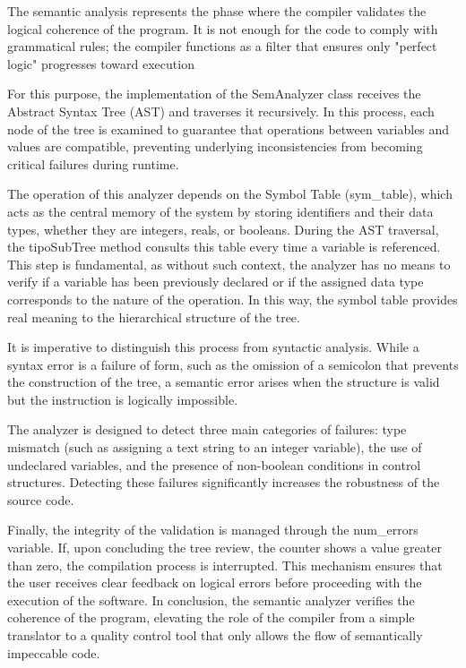 \documentclass[letterpaper,12pt,oneside]{article}
\begin{document}
{The semantic analysis represents the phase where the compiler validates the logical coherence of the program. It is not enough for the code to comply with grammatical rules; the compiler functions as a filter that ensures only "perfect logic" progresses toward execution}

\bigskip

{For this purpose, the implementation of the SemAnalyzer class receives the Abstract Syntax Tree (AST) and traverses it recursively. In this process, each node of the tree is examined to guarantee that operations between variables and values are compatible, preventing underlying inconsistencies from becoming critical failures during runtime.}

\bigskip

{The operation of this analyzer depends on the Symbol Table (sym\_table), which acts as the central memory of the system by storing identifiers and their data types, whether they are integers, reals, or booleans. During the AST traversal, the tipoSubTree method consults this table every time a variable is referenced. This step is fundamental, as without such context, the analyzer has no means to verify if a variable has been previously declared or if the assigned data type corresponds to the nature of the operation. In this way, the symbol table provides real meaning to the hierarchical structure of the tree.}

\bigskip

{It is imperative to distinguish this process from syntactic analysis. While a syntax error is a failure of form, such as the omission of a semicolon that prevents the construction of the tree, a semantic error arises when the structure is valid but the instruction is logically impossible.}

\bigskip

{The analyzer is designed to detect three main categories of failures: type mismatch (such as assigning a text string to an integer variable), the use of undeclared variables, and the presence of non-boolean conditions in control structures. Detecting these failures significantly increases the robustness of the source code.}

\bigskip

{Finally, the integrity of the validation is managed through the num\_errors variable. If, upon concluding the tree review, the counter shows a value greater than zero, the compilation process is interrupted. This mechanism ensures that the user receives clear feedback on logical errors before proceeding with the execution of the software. In conclusion, the semantic analyzer verifies the coherence of the program, elevating the role of the compiler from a simple translator to a quality control tool that only allows the flow of semantically impeccable code.}
\end{document}
